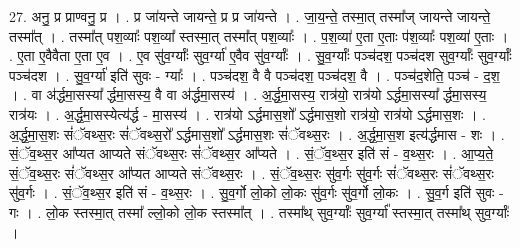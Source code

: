 \documentclass[17pt]{extarticle}
\begin{document}
27. अनु॒ प्र प्राण्वनु॒ प्र । . प्र जा॑यन्ते जायन्ते॒ प्र प्र जा॑यन्ते । . जा॒य॒न्ते॒ तस्मा॒त् तस्मा᳚ज् जायन्ते जायन्ते॒ तस्मा᳚त् । . तस्मा᳚त् पश॒व्याः᳚ पश॒व्या᳚ स्तस्मा॒त् तस्मा᳚त् पश॒व्याः᳚ । . प॒श॒व्या॑ ए॒ता ए॒ताः प॑श॒व्याः᳚ पश॒व्या॑ ए॒ताः । . ए॒ता ए॒वैवैता ए॒ता ए॒व । . ए॒व सु॑व॒र्ग्याः᳚ सुव॒र्ग्या॑ ए॒वैव सु॑व॒र्ग्याः᳚ । . सु॒व॒र्ग्याः᳚ पञ्च॑दश॒ पञ्च॑दश सुव॒र्ग्याः᳚ सुव॒र्ग्याः᳚ पञ्च॑दश । . सु॒व॒र्ग्या॑ इति॑ सुवः - ग्याः᳚ । . पञ्च॑दश॒ वै वै पञ्च॑दश॒ पञ्च॑दश॒ वै । . पञ्च॑द॒शेति॒ पञ्च॑ - द॒श॒ । . वा अ॑र्द्धमा॒सस्या᳚ र्द्धमा॒सस्य॒ वै वा अ॑र्द्धमा॒सस्य॑ । . अ॒र्द्ध॒मा॒सस्य॒ रात्र॑यो॒ रात्र॑यो ऽर्द्धमा॒सस्या᳚ र्द्धमा॒सस्य॒ रात्र॑यः । . अ॒र्द्ध॒मा॒सस्येत्य॑र्द्ध - मा॒सस्य॑ । . रात्र॑यो ऽर्द्धमास॒शो᳚ ऽर्द्धमास॒शो रात्र॑यो॒ रात्र॑यो ऽर्द्धमास॒शः । . अ॒र्द्ध॒मा॒स॒शः सं॑ॅवथ्स॒रः सं॑ॅवथ्स॒रो᳚ ऽर्द्धमास॒शो᳚ ऽर्द्धमास॒शः सं॑ॅवथ्स॒रः । . अ॒र्द्ध॒मा॒स॒श इत्य॑र्द्धमास - शः । . सं॒ॅव॒थ्स॒र आ᳚प्यत आप्यते संॅवथ्स॒रः सं॑ॅवथ्स॒र आ᳚प्यते । . सं॒ॅव॒थ्स॒र इति॑ सं - व॒थ्स॒रः । . आ॒प्य॒ते॒ सं॒ॅव॒थ्स॒रः सं॑ॅवथ्स॒र आ᳚प्यत आप्यते संॅवथ्स॒रः । . सं॒ॅव॒थ्स॒रः सु॑व॒र्गः सु॑व॒र्गः सं॑ॅवथ्स॒रः सं॑ॅवथ्स॒रः सु॑व॒र्गः । . सं॒ॅव॒थ्स॒र इति॑ सं - व॒थ्स॒रः । . सु॒व॒र्गो लो॒को लो॒कः सु॑व॒र्गः सु॑व॒र्गो लो॒कः । . सु॒व॒र्ग इति॑ सुवः - गः । . लो॒क स्तस्मा॒त् तस्मा᳚ ल्लो॒को लो॒क स्तस्मा᳚त् । . तस्मा᳚थ् सुव॒र्ग्याः᳚ सुव॒र्ग्या᳚ स्तस्मा॒त् तस्मा᳚थ् सुव॒र्ग्याः᳚ । \newline
\end{document}
